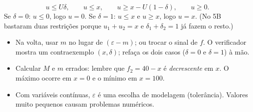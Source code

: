\begin{receita}[produto de contínua por binária: $u=x\,\delta$, com $0\le x\le U$]
\[
u\le U\delta,\qquad u\le x,\qquad u\ge x-U(1-\delta),\qquad u\ge0.
\]
Se $\delta=0$: $u\le0$, logo $u=0$. Se $\delta=1$: $u\le x$ e $u\ge x$, logo $u=x$. (No 5B bastaram duas
restrições porque $u_1+u_2=x$ e $\delta_1+\delta_2=1$ já fazem o resto.)
\end{receita}

\begin{atencao}
\begin{itemize}
  \item Na volta, usar $m$ no lugar de $(\varepsilon-m)$; ou trocar o sinal de $f$. O verificador mostra um
  contraexemplo $(x,\delta)$; refaça os dois casos ($\delta=0$ e $\delta=1$) à mão.
  \item Calcular $M$ e $m$ errados: lembre que $f_2=40-x$ é \emph{decrescente} em $x$. O máximo ocorre em $x=0$ e o
  mínimo em $x=100$.
  \item Com variáveis contínuas, $\varepsilon$ é uma escolha de modelagem (tolerância). Valores muito pequenos causam
  problemas numéricos.
\end{itemize}
\end{atencao}
